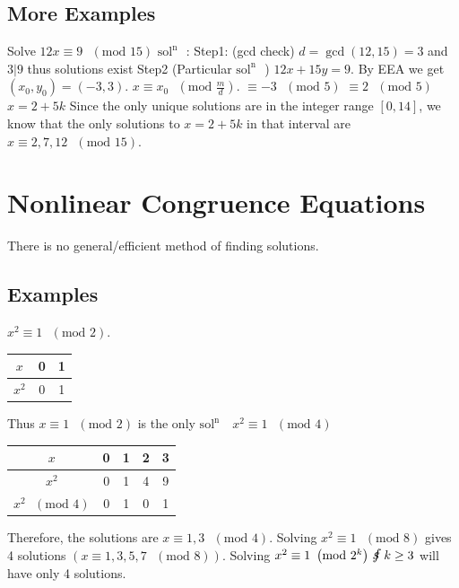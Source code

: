 \documentclass[oneside]{book}
\newcommand\tab[1][1cm]{\hspace*{#1}}
\newcommand\nextline{\newline\tab}
\newcommand\soln{$\text{sol}^\text{n}\text{ }$}
\newcommand\fs{\mbox{\large $\mathrlap{f}s\,$}\,}
\renewcommand\mod[1]{\text{ }\left(\text{mod }#1\right)}
\begin{document}
\subsection{More Examples}
Solve $12x\equiv 9\mod{15}$\nextline
\soln: Step1: (gcd check)
$d=\gcd(12,15)=3$ and $3\lvert9$ thus solutions exist\newline
Step2 (Particular \soln)\nextline
$12x+15y=9$. By EEA we get $(x_0, y_0) = (-3,3)$.\nextline
$x\equiv x_0\mod{\frac{m}{d}}$.\nextline
$\equiv -3\mod{5}$\nextline
$\equiv 2\mod{5}$\nextline
$x=2+5k$\nextline
Since the only unique solutions are in the integer range $[0,14]$, we know that the only solutions to $x=2+5k$ in that interval are $x\equiv2,7,12\mod{15}$.
\section{Nonlinear Congruence Equations}
\tab
There is no general/efficient method of finding solutions.\nextline
\subsection{Examples}
$x^2\equiv 1\mod{2}$.
\begin{center}
\begin{tabular}{|c|c|c|}
$x$ & 0 & 1 \\
\hline
$x^2$ & 0 & 1
\end{tabular}
\end{center}
\tab
Thus $x\equiv 1\mod{2}$ is the only \soln
\nextline
$x^2\equiv 1\mod{4}$
\begin{center}
\begin{tabular}{|c|c|c|c|c|}
$x$ & 0 & 1 & 2 & 3\\
\hline
$x^2$ & 0 & 1 & 4 & 9 \\
\hline
$x^2\mod{4}$ & 0 & 1 & 0 & 1
\end{tabular}
\end{center}
\tab
Therefore, the solutions are $x\equiv 1,3\mod{4}$.
\nextline
Solving $x^2\equiv 1\mod{8}$ gives 4 solutions $\left(x\equiv1,3,5,7\mod{8}\right)$. Solving $x^2\equiv 1\mod{2^k}\, \fs k\geq3$ will have only 4 solutions.
\end{document}
